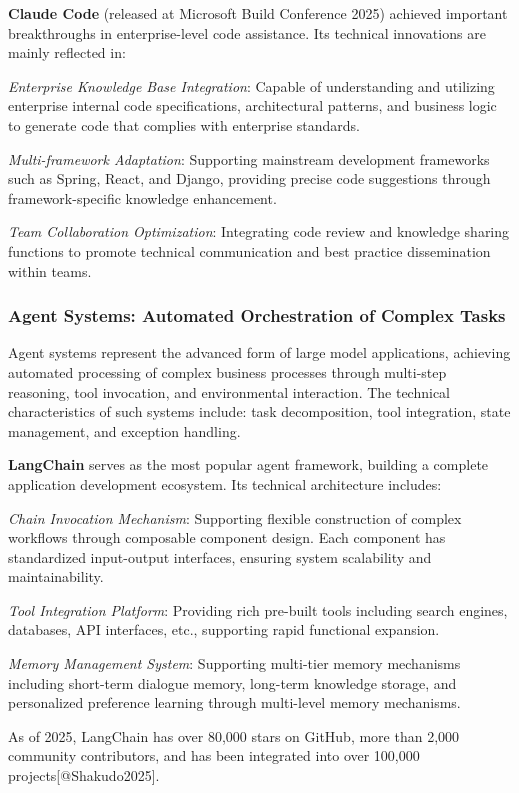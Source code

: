 \documentclass{article}
\begin{document}
\textbf{Claude Code} (released at Microsoft Build Conference 2025) achieved important breakthroughs in enterprise-level code assistance. Its technical innovations are mainly reflected in:

\textit{Enterprise Knowledge Base Integration}: Capable of understanding and utilizing enterprise internal code specifications, architectural patterns, and business logic to generate code that complies with enterprise standards.

\textit{Multi-framework Adaptation}: Supporting mainstream development frameworks such as Spring, React, and Django, providing precise code suggestions through framework-specific knowledge enhancement.

\textit{Team Collaboration Optimization}: Integrating code review and knowledge sharing functions to promote technical communication and best practice dissemination within teams.

\subsubsection{Agent Systems: Automated Orchestration of Complex Tasks}
Agent systems represent the advanced form of large model applications, achieving automated processing of complex business processes through multi-step reasoning, tool invocation, and environmental interaction. The technical characteristics of such systems include: task decomposition, tool integration, state management, and exception handling.

\textbf{LangChain} serves as the most popular agent framework, building a complete application development ecosystem. Its technical architecture includes:

\textit{Chain Invocation Mechanism}: Supporting flexible construction of complex workflows through composable component design. Each component has standardized input-output interfaces, ensuring system scalability and maintainability.

\textit{Tool Integration Platform}: Providing rich pre-built tools including search engines, databases, API interfaces, etc., supporting rapid functional expansion.

\textit{Memory Management System}: Supporting multi-tier memory mechanisms including short-term dialogue memory, long-term knowledge storage, and personalized preference learning through multi-level memory mechanisms.

As of 2025, LangChain has over 80,000 stars on GitHub, more than 2,000 community contributors, and has been integrated into over 100,000 projects[@Shakudo2025].
\end{document}
